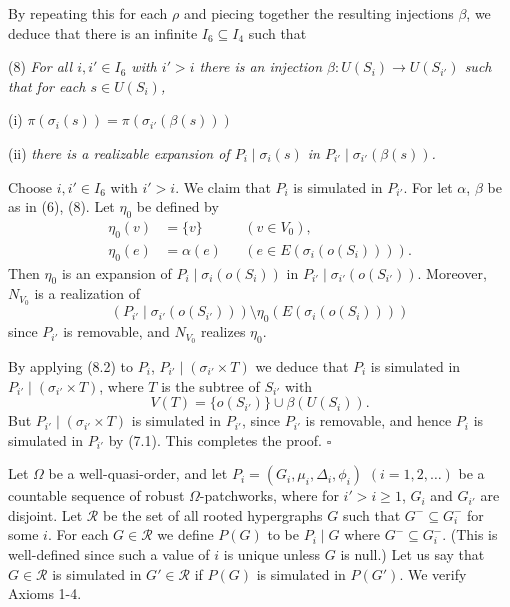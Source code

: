 By repeating this for each $\rho$ and piecing together the resulting injections $\beta$, we deduce that there is an infinite $I_6 \subseteq I_4$ such that

\hspace*{12pt}(8) \textit{For all $i, i' \in I_6$ with $i' > i$ there is an injection $\beta \colon U(S_i) \to U(S_{i'})$ such that for each $s \in U(S_i)$,}

\hspace*{12pt}(i) $\pi(\sigma_i(s)) = \pi(\sigma_{i'}(\beta(s)))$

\hspace*{12pt}(ii) \textit{there is a realizable expansion of $P_i \mid \sigma_i(s)$ in $P_{i'} \mid \sigma_{i'}(\beta(s))$.}

Choose $i, i' \in I_6$ with $i' > i$. We claim that $P_i$ is simulated in $P_{i'}$. For let $\alpha$, $\beta$ be as in (6), (8). Let $\eta_0$ be defined by
\begin{align*}
\eta_0(v) &= \{v\} && (v \in V_0), \\
\eta_0(e) &= \alpha(e) && (e \in E(\sigma_i(o(S_i)))).
\end{align*}
Then $\eta_0$ is an expansion of $P_i \mid \sigma_i(o(S_i))$ in $P_{i'} \mid \sigma_{i'}(o(S_{i'}))$. Moreover, $N_{V_0}$ is a realization of
\begin{equation*}
(P_{i'} \mid \sigma_{i'}(o(S_{i'}))) \setminus \eta_0(E(\sigma_i(o(S_i))))
\end{equation*}
since $P_{i'}$ is removable, and $N_{V_0}$ realizes $\eta_0$.

By applying (8.2) to $P_i$, $P_{i'} \mid (\sigma_{i'} \times T)$ we deduce that $P_i$ is simulated in $P_{i'} \mid (\sigma_{i'} \times T)$, where $T$ is the subtree of $S_{i'}$ with
\begin{equation*}
V(T) = \{o(S_{i'})\} \cup \beta(U(S_i)).
\end{equation*}
But $P_{i'} \mid (\sigma_{i'} \times T)$ is simulated in $P_{i'}$, since $P_{i'}$ is removable, and hence $P_i$ is simulated in $P_{i'}$ by (7.1). This completes the proof. $\square$


Let $\Omega$ be a well-quasi-order, and let $P_i = (G_i, \mu_i, \Delta_i, \phi_i)$ $(i = 1, 2, \dots)$ be a countable sequence of robust $\Omega$-patchworks, where for $i' > i \ge 1$, $G_i$ and $G_{i'}$ are disjoint. Let $\mathscr{R}$ be the set of all rooted hypergraphs $G$ such that $G^- \subseteq G_i^-$ for some $i$. For each $G \in \mathscr{R}$ we define $P(G)$ to be $P_i \mid G$ where $G^- \subseteq G_i^-$. (This is well-defined since such a value of $i$ is unique unless $G$ is null.) Let us say that $G \in \mathscr{R}$ is simulated in $G' \in \mathscr{R}$ if $P(G)$ is simulated in $P(G')$. We verify Axioms 1-4.

